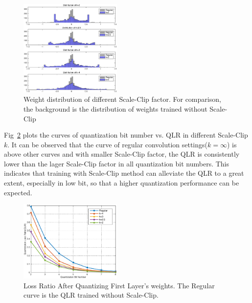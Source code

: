 \documentclass[letterpaper]{article} %
\begin{document}
\begin{figure}[ht!]
	\includegraphics[width=0.45\textwidth]{dist4.eps}
	\caption{Weight distribution of different Scale-Clip factor. For comparison, the background is the distribution of weights trained without Scale-Clip}\label{cifar100_distribution}
\end{figure}

Fig~\ref{fig:qwlr} plots the curves of quantization bit number vs. QLR in different Scale-Clip $k$. It can be observed that the curve of regular convolution settings($k=\infty$) is above other curves and with smaller Scale-Clip factor, the QLR is consistently lower than the lager Scale-Clip factor in all quantization bit numbers. This indicates that training with Scale-Clip method can alleviate the QLR to a great extent, especially in low bit, so that a higher quantization performance can be expected. 

\begin{figure}[ht!]
	\includegraphics[width=0.45\textwidth]{qlr.eps}
	\caption{Loss Ratio After Quantizing First Layer's weights. The Regular curve is the QLR trained without Scale-Clip.}\label{fig:qwlr}
\end{figure}
\end{document}
